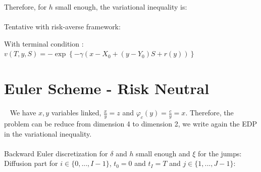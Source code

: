 \documentclass[8pt]{article}
\begin{document}
Therefore, for $h$ small enough, the variational inequality is:\\

\\

Tentative with risk-averse framework:

With terminal condition : $v(T,y,S)=- \exp \left\{ - \gamma \left( x-X_{0} +(y-Y_{0})S + r(y) \right) \right\}$ \\

\section{Euler Scheme - Risk Neutral}
~
We have $x,y$ variables linked, $\frac{x}{y}=z$ and $\varphi_{c}(y) = \frac{c}{y} = x$. Therefore, the problem can be reduce from dimension 4 to dimension 2, we write again the EDP in the variational inequality.\\

\\

Backward Euler discretization for $\delta$ and $h$ small enough and $\xi$ for the jumps:\\

Diffusion part for $i \in \{0,...,I-1\}$, $t_0=0$ and $t_I=T$ and $j \in \{1,...,J-1\}$:\\
\end{document}
